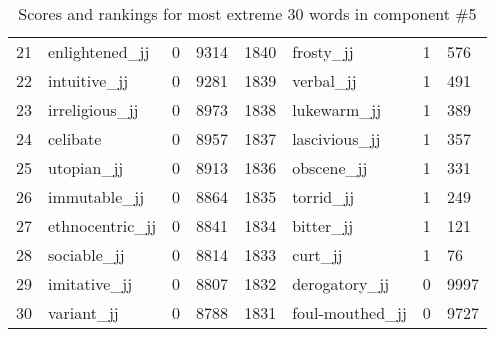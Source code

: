 \begin{table}[tbp]
\begin{tabular}{| rlr@{.}l | rlr@{.}l |}
    21 & enlightened\_jj & 0 & 9314    &    1840 & frosty\_jj & 1 & 576 \\
    22 & intuitive\_jj & 0 & 9281    &    1839 & verbal\_jj & 1 & 491 \\
    23 & irreligious\_jj & 0 & 8973    &    1838 & lukewarm\_jj & 1 & 389 \\
    24 & celibate & 0 & 8957    &    1837 & lascivious\_jj & 1 & 357 \\
    25 & utopian\_jj & 0 & 8913    &    1836 & obscene\_jj & 1 & 331 \\
    26 & immutable\_jj & 0 & 8864    &    1835 & torrid\_jj & 1 & 249 \\
    27 & ethnocentric\_jj & 0 & 8841    &    1834 & bitter\_jj & 1 & 121 \\
    28 & sociable\_jj & 0 & 8814    &    1833 & curt\_jj & 1 & 76 \\
    29 & imitative\_jj & 0 & 8807    &    1832 & derogatory\_jj & 0 & 9997 \\
    30 & variant\_jj & 0 & 8788    &    1831 & foul-mouthed\_jj & 0 & 9727 \\
    \hline
    \end{tabular}
    \caption{Scores and rankings for most extreme 30 words in component \#5} 
\end{table}
\clearpage
